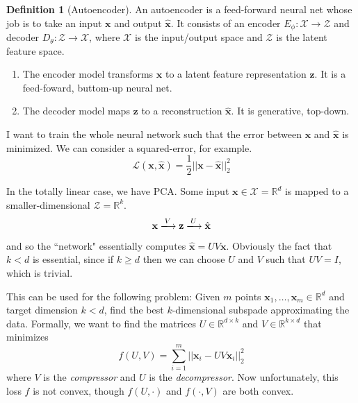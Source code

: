 \documentclass{article}
\theoremstyle{definition}
\theoremstyle{remark}
\theoremstyle{definition}
\newtheorem{definition}{Definition}[section]
\begin{document}
\begin{definition}[Autoencoder]
    An autoencoder is a feed-forward neural net whose job is to take an input $\mathbf{x}$ and output $\hat{\mathbf{x}}$. It consists of an encoder $E_\phi: \mathcal{X} \rightarrow \mathcal{Z}$ and decoder $D_\theta: \mathcal{Z} \rightarrow \mathcal{X}$, where $\mathcal{X}$ is the input/output space and $\mathcal{Z}$ is the latent feature space. 
\begin{enumerate}
    \item The encoder model transforms $\mathbf{x}$ to a latent feature representation $\mathbf{z}$. It is a feed-foward, buttom-up neural net. 
    \item The decoder model maps $\mathbf{z}$ to a reconstruction $\hat{\mathbf{x}}$. It is generative, top-down. 
\end{enumerate}
I want to train the whole neural network such that the error between $\mathbf{x}$ and $\hat{\mathbf{x}}$ is minimized. We can consider a squared-error, for example. 
\[\mathcal{L}(\mathbf{x}, \hat{\mathbf{x}}) = \frac{1}{2} ||\mathbf{x} - \hat{\mathbf{x}}||_2^2\]
\end{definition}

In the totally linear case, we have PCA. Some input $\mathbf{x} \in \mathcal{X} = \mathbb{R}^d$ is mapped to a smaller-dimensional $\mathcal{Z} = \mathbb{R}^k$. 
\[\mathbf{x} \xlongrightarrow[]{V} \mathbf{z} \xlongrightarrow{U} \hat{\mathbf{x}}\]
and so the ``network" essentially computes $\hat{\mathbf{x}} = U V \mathbf{x}$. Obviously the fact that $k < d$ is essential, since if $k \geq d$ then we can choose $U$ and $V$ such that $UV = I$, which is trivial. 

This can be used for the following problem: Given $m$ points $\mathbf{x}_1, \ldots, \mathbf{x}_m \in \mathbb{R}^d$ and target dimension $k < d$, find the best $k$-dimensional subspade approximating the data. Formally, we want to find the matrices $U \in \mathbb{R}^{d \times k}$ and $V \in \mathbb{R}^{k \times d}$ that minimizes 
\[f(U, V) = \sum_{i=1}^m ||\mathbf{x}_i - U V \mathbf{x}_i||_2^2 \] 
where $V$ is the \textit{compressor} and $U$ is the \textit{decompressor}. Now unfortunately, this loss $f$ is not convex, though $f(U, \cdot)$ and $f(\cdot, V)$ are both convex. 
\end{document}
